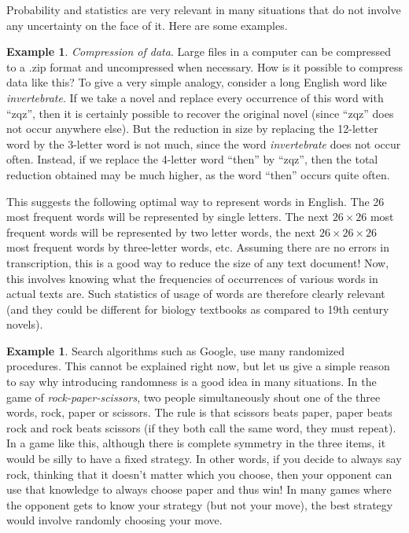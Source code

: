 \documentclass[preprint,  11pt]{amsart}
\newcommand{\para}[1]{\vspace{4mm}\noindent{\bfseries #1:}}
\theoremstyle{plain} %
\theoremstyle{definition} %
\newtheorem{example}[theorem]{Example}
\begin{document}
\para{However...} Probability and statistics are very relevant in many situations that do not involve any uncertainty on the face of it. Here are some examples.
\begin{example} {\em Compression of data}. Large files in a computer can be compressed to a .zip format and uncompressed when necessary. How is it possible to compress data like this? To give a very simple analogy, consider a long English word like {\em invertebrate}. If we take a novel and replace every occurrence of this word with ``zqz'', then  it is certainly possible to recover the original novel (since ``zqz'' does not occur anywhere else). But the reduction in size by replacing the 12-letter word by the 3-letter word is not much, since the word {\em invertebrate} does not occur often. Instead, if we replace the 4-letter word ``then'' by ``zqz'', then the total reduction obtained may be much higher, as the word ``then'' occurs quite often.

This suggests the following optimal way to represent words in English. The 26 most frequent words will be represented by single letters. The next $26\times 26$ most frequent words will be represented by two letter words, the next $26\times 26\times 26$ most frequent words by three-letter words, etc. Assuming there are no errors in transcription, this is a good way to reduce the size of any text document! Now, this involves knowing what the frequencies of occurrences of various words in actual texts are. Such statistics of usage of words are therefore clearly relevant (and they could be different for biology textbooks as compared to 19th century novels).
\end{example}
\begin{example} Search algorithms such as Google, use many randomized procedures. This cannot be explained right now, but let us give a simple reason to say why introducing randomness is a good idea in many situations. In the game of {\em rock-paper-scissors}, two people simultaneously shout one of the three words, rock, paper or scissors. The rule is that scissors beats paper, paper beats rock and rock beats scissors (if they both call the same word, they must repeat). In a game like this, although there is complete symmetry in the three items, it would be silly to have a fixed strategy. In other words, if you decide to always say rock, thinking that it doesn't matter which you choose, then your opponent can use that knowledge to always choose paper and thus win! In many games where the opponent gets to know your strategy (but not your move), the best strategy would involve  randomly choosing your move.
\end{example}
\end{document}
